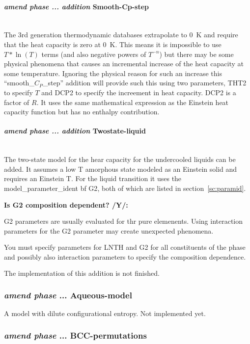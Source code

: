 \documentclass[11pt]{article}
\newcommand{\subsubsubsection}[1]{\paragraph{#1}\mbox{}\\}
\begin{document}
\hypertarget{Amend smooth-Cp-step}{}
\subsubsubsection{{\em amend phase ... addition} Smooth-Cp-step}

The 3rd generation thermodynamic databases extrapolate to 0~K and
require that the heat capacity is zero at 0~K.  This means it is
impossible to use $T*\ln(T)$ terms (and also negative powers of
$T^{-n}$) but there may be some physical phenomena that causes an
incremental increase of the heat capacity at some temperature.
Ignoring the physical reason for such an increase this
``smooth\_$C_P$\_step'' addition will provide such this using two
parameters, THT2 to specify $T$ and DCP2 to specify the increement in
heat capacity.  DCP2 is a factor of $R$.  It uses the same
mathematical expression as the Einstein heat capacity function but has
no enthalpy contribution.

\hypertarget{Amend twostate liquid}{}
\subsubsubsection{{\em amend phase ... addition} Twostate-liquid}

The two-state model for the hear capacity for the undercooled liquids
can be added.  It assumes a low T amorphous state modeled as an
Einstein solid and requires an Einstein T.  For the liquid transition
it uses the model\_parameter\_ident {bf G2}, both of which are listed
in section~\ref{sc:paramid}.

{\bf Is G2 composition dependent? /Y/:}

G2 parameters are usually evaluated for thr pure elemenents.  Using
interaction parameters for the G2 parameter may create unexpected
phenomena.

You must specify parameters for LNTH and G2 for all constituents of
the phase and possibly also interaction parameters to specify the
composition dependence.

The implementation of this addition is not finished.


\hypertarget{Addition aqueus-model}{}
\subsubsection{{\em amend phase} ... Aqueous-model}

A model with dilute configurational entropy.  Not implemented yet.

\hypertarget{Amend BCC-permutations}{}
\subsubsection{{\em amend phase} ... BCC-permutations}
\end{document}
